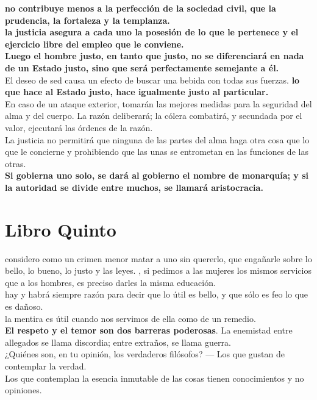 \documentclass[10pt]{book}
\begin{document}
\textbf{no contribuye menos a la perfección de la sociedad civil, que la prudencia, la fortaleza y la templanza.}\\
\textbf{la justicia asegura a cada uno la posesión de lo que le pertenece y el ejercicio libre del  empleo que le conviene. }\\
\textbf{Luego el hombre justo, en tanto que justo, no se diferenciará en nada de un Estado justo, sino que será perfectamente semejante a él.}\\
El deseo de sed causa un efecto de buscar una bebida con todas sus fuerzas.
\textbf{lo que hace al Estado justo, hace igualmente justo al particular. } \\
En caso de un ataque exterior, tomarán las mejores medidas para la seguridad del alma y del cuerpo. La razón deliberará; la cólera combatirá, y secundada por el valor, ejecutará las órdenes de la razón. \\
La justicia no permitirá que ninguna de las partes del alma haga otra cosa que lo que le concierne y prohibiendo que las unas se entrometan en las funciones de las otras.\\
\textbf{ Si gobierna uno solo, se dará al gobierno el nombre de monarquía; y si la autoridad se divide entre muchos, se llamará aristocracia. }

\chapter*{Libro Quinto}
considero como un crimen menor matar a uno sin quererlo, que engañarle sobre lo bello, lo bueno, lo justo y las leyes. , si pedimos a las mujeres los mismos servicios que a los hombres, es preciso darles la misma educación. \\
hay y habrá siempre razón para decir que lo útil es bello, y que sólo es feo lo que es dañoso. \\
la mentira es útil cuando nos servimos de ella como de un remedio. \\
\textbf{El respeto y el temor son dos barreras poderosas}. La enemistad entre allegados se llama discordia; entre extraños, se llama guerra. \\
¿Quiénes son, en tu opinión, los verdaderos filósofos? — Los que gustan de contemplar la verdad. \\
Los que contemplan la esencia inmutable de las cosas tienen conocimientos y no opiniones.
\end{document}
